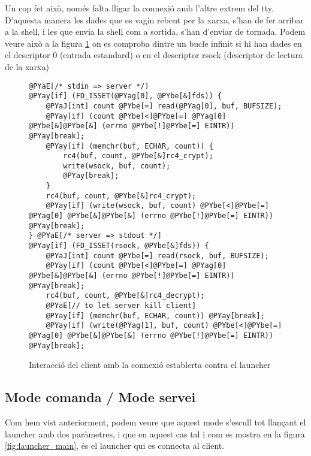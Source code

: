 Un cop fet això, només falta lligar la connexió amb l'altre extrem del tty. D'aquesta manera les dades que es vagin rebent per la xarxa, s'han de fer arribar a la shell, i les que envia la shell com a sortida, s'han d'enviar de tornada. Podem veure això a la figura \ref{fig:client_client_shell} on es comproba dintre un bucle infinit si hi han dades en el descriptor 0 (entrada estandard) o en el descriptor rsock (descriptor de lectura de la xarxa) 

\begin{figure}[h!]
\begin{Verbatim}[commandchars=@\[\]]
@PYaE[/* stdin => server */]
@PYay[if] (FD_ISSET(@PYag[0], @PYbe[&]fds)) {
    @PYaJ[int] count @PYbe[=] read(@PYag[0], buf, BUFSIZE);
    @PYay[if] (count @PYbe[<]@PYbe[=] @PYag[0] @PYbe[&]@PYbe[&] (errno @PYbe[!]@PYbe[=] EINTR)) @PYay[break];
    @PYay[if] (memchr(buf, ECHAR, count)) {
        rc4(buf, count, @PYbe[&]rc4_crypt);
        write(wsock, buf, count);
        @PYay[break]; 
    }
    rc4(buf, count, @PYbe[&]rc4_crypt);
    @PYay[if] (write(wsock, buf, count) @PYbe[<]@PYbe[=] @PYag[0] @PYbe[&]@PYbe[&] (errno @PYbe[!]@PYbe[=] EINTR))  @PYay[break]; 
} @PYaE[/* server => stdout */]
@PYay[if] (FD_ISSET(rsock, @PYbe[&]fds)) {
    @PYaJ[int] count @PYbe[=] read(rsock, buf, BUFSIZE);
    @PYay[if] (count @PYbe[<]@PYbe[=] @PYag[0] @PYbe[&]@PYbe[&] (errno @PYbe[!]@PYbe[=] EINTR)) @PYay[break];
    rc4(buf, count, @PYbe[&]rc4_decrypt);
    @PYaE[// to let server kill client]
    @PYay[if] (memchr(buf, ECHAR, count)) @PYay[break]; 
    @PYay[if] (write(@PYag[1], buf, count) @PYbe[<]@PYbe[=] @PYag[0] @PYbe[&]@PYbe[&] (errno @PYbe[!]@PYbe[=] EINTR)) @PYay[break];
\end{Verbatim}
\caption{Interacció del client amb la connexió establerta contra el launcher}
\label{fig:client_client_shell}
\end{figure}

\subsection{Mode comanda / Mode servei}

Com hem vist anteriorment, podem veure que aquest mode s'escull tot llançant el launcher
amb dos paràmetres, i que en aquest cas tal i com es mostra en la figura \ref{fig:launcher_main},
és el launcher qui es connecta al client.

